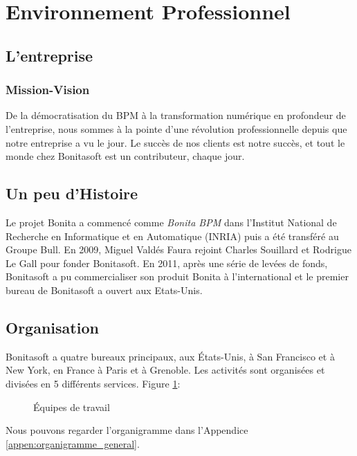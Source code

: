 \section{Environnement Professionnel}
\subsection{L'entreprise}
\subsubsection{Mission-Vision}
De la démocratisation du BPM à la transformation numérique en profondeur de l'entreprise, nous sommes à la pointe d'une révolution professionnelle depuis que notre entreprise a vu le jour.
Le succès de nos clients est notre succès, et tout le monde chez Bonitasoft est un contributeur, chaque jour.
\cite{Bonitasoft2017BONITA}

\subsection{Un peu d'Histoire}
Le projet Bonita a commencé comme \emph{Bonita BPM} dans l'Institut National de Recherche en Informatique et en Automatique (INRIA) puis a été transféré au Groupe Bull.
En 2009, Miguel Valdés Faura rejoint Charles Souillard et Rodrigue Le Gall pour fonder Bonitasoft.
En 2011, après une série de levées de fonds, Bonitasoft a pu commercialiser son produit Bonita à l'international et le premier bureau de Bonitasoft a ouvert aux Etats-Unis.\cite{wikipedia_2018}

\subsection{Organisation}
Bonitasoft a quatre bureaux principaux, aux États-Unis, à San Francisco et à New York, en France à Paris et à Grenoble.
Les activités sont organisées et divisées en 5 différents services. Figure \ref{fig:equipe_travail}:

\begin{figure}[h!]
  \centering
  \caption{Équipes de travail}
  \label{fig:equipe_travail}
\end{figure}

Nous pouvons regarder l'organigramme dans l'Appendice \ref{appen:organigramme_general}.







